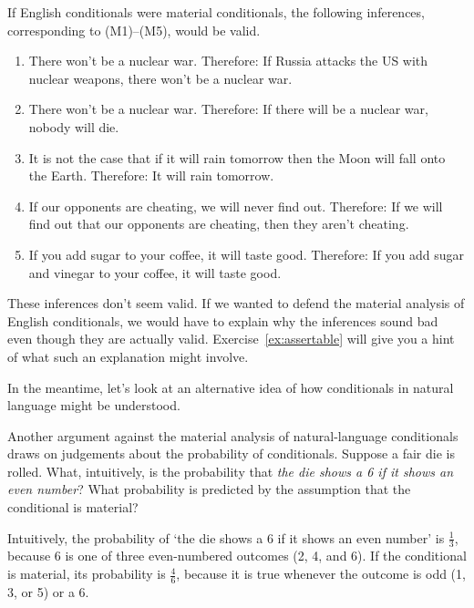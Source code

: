 If English conditionals were material conditionals, the following inferences,
corresponding to (M1)--(M5), would be valid.

\begin{enumerate}[leftmargin=12mm]
  \itemsep1mm
  \item[(E1)] There won't be a nuclear war. Therefore: If Russia attacks the US
        with nuclear weapons, there won't be a nuclear war.
  \item[(E2)] There won't be a nuclear war. Therefore: If there will be a
        nuclear war, nobody will die.
  \item[(E3)] It is not the case that if it will rain tomorrow then the Moon
        will fall onto the Earth. Therefore: It will rain tomorrow.
  \item[(E4)] If our opponents are cheating, we will never find out. Therefore:
        If we will find out that our opponents are cheating, then they aren't
        cheating.
  \item[(E5)] If you add sugar to your coffee, it will taste good. Therefore: If
        you add sugar and vinegar to your coffee, it will taste good.
\end{enumerate}

These inferences don't seem valid. If we wanted to defend the material analysis
of English conditionals, we would have to explain why the inferences sound bad
even though they are actually valid. Exercise~\ref{ex:assertable} will give you
a hint of what such an explanation might involve.

In the meantime, let's look at an alternative idea of how conditionals in natural
language might be understood.

\begin{exercise}\label{ex:probcond}
  Another argument against the material analysis of natural-language
  conditionals draws on judgements about the probability of conditionals.
  Suppose a fair die is rolled. What, intuitively, is the probability that
  \emph{the die shows a 6 if it shows an even number}? What probability is predicted by the assumption that the conditional is material?
\end{exercise}
\begin{solution}
  Intuitively, the probability of `the die shows a 6 if it shows an even number'
  is $\frac{1}{3}$, because 6 is one of three even-numbered outcomes
  (2, 4, and 6). If the conditional is material, its probability is
  $\frac{4}{6}$, because it is true whenever the outcome is odd (1, 3, or 5) or
  a 6.
\end{solution}

